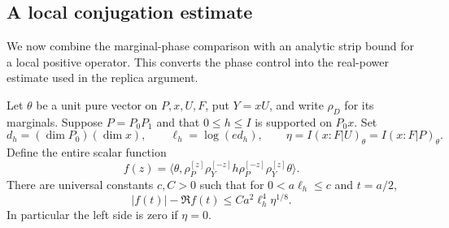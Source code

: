 \subsection{A local conjugation estimate}

We now combine the marginal-phase comparison with an analytic strip
bound for a local positive operator.  This converts the phase control
into the real-power estimate used in the replica argument.

\begin{lemma}\label{lem:skew}
Let $\theta$ be a unit pure vector on $P,x,U,F$, put $Y=xU$, and
write $\rho_D$ for its marginals.  Suppose $P=P_0P_1$ and that
$0\le h\le I$ is supported on $P_0x$.  Set
\[
 d_h=(\dim P_0)(\dim x),\qquad \ell_h=\log(ed_h),\qquad
 \eta=I(x:F|U)_\theta=I(x:F|P)_\theta.
\]
Define the entire scalar function
\[
 f(z)=\langle\theta,
       \rho_P^{[z]}\rho_Y^{[-z]}h
       \rho_P^{[-z]}\rho_Y^{[z]}\theta\rangle.
\]
There are universal constants $c,C>0$ such that for
$0<a\ell_h\le c$ and $t=a/2$,
\begin{equation}\label{eq:conditional-skew}
 |f(t)|-\Re f(t)\le C a^2\ell_h^4\eta^{1/8}.
\end{equation}
In particular the left side is zero if $\eta=0$.
\end{lemma}

